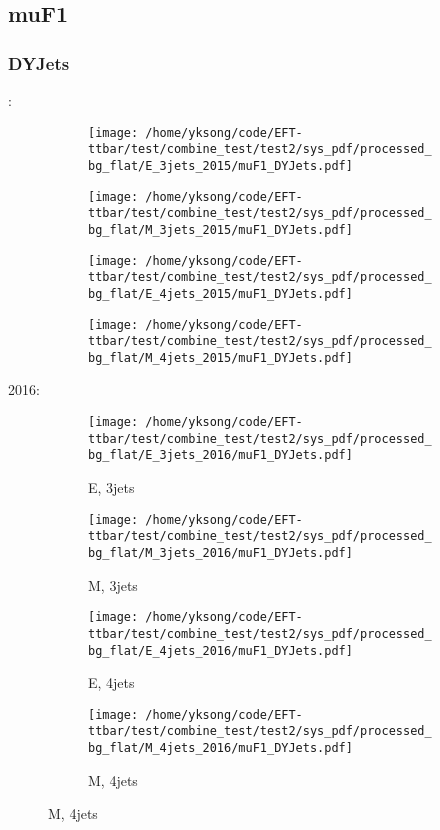 \documentclass{beamer}
\begin{document}
\subsection{muF1}

\begin{frame}
\frametitle{DYJets}
\fontsize{5}{1}:
\begin{figure}
\centering
\begin{subfigure}[b]{0.24\textwidth}
\texttt{[image: /home/yksong/code/EFT-ttbar/test/combine\_test/test2/sys\_pdf/processed\_bg\_flat/E\_3jets\_2015/muF1\_DYJets.pdf]}
\end{subfigure}
\begin{subfigure}[b]{0.24\textwidth}
\texttt{[image: /home/yksong/code/EFT-ttbar/test/combine\_test/test2/sys\_pdf/processed\_bg\_flat/M\_3jets\_2015/muF1\_DYJets.pdf]}
\end{subfigure}
\begin{subfigure}[b]{0.24\textwidth}
\texttt{[image: /home/yksong/code/EFT-ttbar/test/combine\_test/test2/sys\_pdf/processed\_bg\_flat/E\_4jets\_2015/muF1\_DYJets.pdf]}
\end{subfigure}
\begin{subfigure}[b]{0.24\textwidth}
\texttt{[image: /home/yksong/code/EFT-ttbar/test/combine\_test/test2/sys\_pdf/processed\_bg\_flat/M\_4jets\_2015/muF1\_DYJets.pdf]}
\end{subfigure}
\end{figure}
2016:
\begin{figure}
\centering
\begin{subfigure}[b]{0.24\textwidth}
\texttt{[image: /home/yksong/code/EFT-ttbar/test/combine\_test/test2/sys\_pdf/processed\_bg\_flat/E\_3jets\_2016/muF1\_DYJets.pdf]}
\captionsetup{font=tiny}
\caption{E, 3jets}
\end{subfigure}
\begin{subfigure}[b]{0.24\textwidth}
\texttt{[image: /home/yksong/code/EFT-ttbar/test/combine\_test/test2/sys\_pdf/processed\_bg\_flat/M\_3jets\_2016/muF1\_DYJets.pdf]}
\captionsetup{font=tiny}
\caption{M, 3jets}
\end{subfigure}
\begin{subfigure}[b]{0.24\textwidth}
\texttt{[image: /home/yksong/code/EFT-ttbar/test/combine\_test/test2/sys\_pdf/processed\_bg\_flat/E\_4jets\_2016/muF1\_DYJets.pdf]}
\captionsetup{font=tiny}
\caption{E, 4jets}
\end{subfigure}
\begin{subfigure}[b]{0.24\textwidth}
\texttt{[image: /home/yksong/code/EFT-ttbar/test/combine\_test/test2/sys\_pdf/processed\_bg\_flat/M\_4jets\_2016/muF1\_DYJets.pdf]}
\captionsetup{font=tiny}
\caption{M, 4jets}
\end{subfigure}
\end{figure}
\end{frame}
\end{document}
